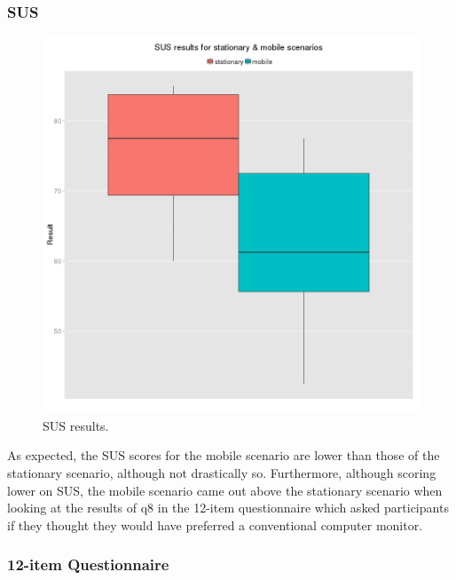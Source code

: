 
\pagebreak

\subsubsection{SUS}

\begin{figure}[h]
	\begin{center}
		\includegraphics[width=0.7\linewidth]{images/sus.png}
		\caption{SUS results.}
		\label{sus}
	\end{center}
\end{figure}

As expected, the SUS scores for the mobile scenario are lower than those of the stationary scenario, although not drastically so. Furthermore, although scoring lower on SUS, the mobile scenario came out above the stationary scenario when looking at the results of q8 in the 12-item questionnaire which asked participants if they thought they would have preferred a conventional computer monitor.

\pagebreak

\subsubsection{12-item Questionnaire}

